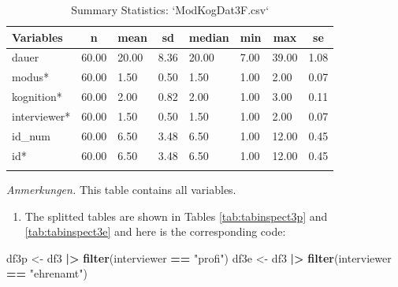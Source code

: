 \documentclass[
  doc,floatsintext]{apa6}
\newenvironment{Shaded}{\begin{snugshade}}{\end{snugshade}}
\newcommand{\FunctionTok}[1]{\textcolor[rgb]{0.13,0.29,0.53}{\textbf{#1}}}
\newcommand{\NormalTok}[1]{#1}
\newcommand{\OtherTok}[1]{\textcolor[rgb]{0.56,0.35,0.01}{#1}}
\newcommand{\SpecialCharTok}[1]{\textcolor[rgb]{0.81,0.36,0.00}{\textbf{#1}}}
\newcommand{\StringTok}[1]{\textcolor[rgb]{0.31,0.60,0.02}{#1}}
\providecommand{\tightlist}{%
  \setlength{\itemsep}{0pt}\setlength{\parskip}{0pt}}
\begin{document}
\begin{table}[tbp]

\begin{center}
\begin{threeparttable}

\caption{\label{tab:tabsumstat3correct}Summary Statistics: `ModKogDat3F.csv`}

\begin{tabular}{llllllll}
\toprule
Variables & \multicolumn{1}{c}{n} & \multicolumn{1}{c}{mean} & \multicolumn{1}{c}{sd} & \multicolumn{1}{c}{median} & \multicolumn{1}{c}{min} & \multicolumn{1}{c}{max} & \multicolumn{1}{c}{se}\\
\midrule
dauer & 60.00 & 20.00 & 8.36 & 20.00 & 7.00 & 39.00 & 1.08\\
modus* & 60.00 & 1.50 & 0.50 & 1.50 & 1.00 & 2.00 & 0.07\\
kognition* & 60.00 & 2.00 & 0.82 & 2.00 & 1.00 & 3.00 & 0.11\\
interviewer* & 60.00 & 1.50 & 0.50 & 1.50 & 1.00 & 2.00 & 0.07\\
id\_num & 60.00 & 6.50 & 3.48 & 6.50 & 1.00 & 12.00 & 0.45\\
id* & 60.00 & 6.50 & 3.48 & 6.50 & 1.00 & 12.00 & 0.45\\
\bottomrule
\addlinespace
\end{tabular}

\begin{tablenotes}[para]
\normalsize{\textit{Anmerkungen.} This table contains all variables.}
\end{tablenotes}

\end{threeparttable}
\end{center}

\end{table}

\begin{enumerate}
\def\labelenumi{\arabic{enumi}.}
\setcounter{enumi}{1}
\tightlist
\item
  The splitted tables are shown in Tables \ref{tab:tabinspect3p} and \ref{tab:tabinspect3e} and here is the corresponding code:
\end{enumerate}

\begin{Shaded}
\begin{Highlighting}[]
\NormalTok{df3p }\OtherTok{\textless{}{-}}\NormalTok{ df3 }\SpecialCharTok{|\textgreater{}} 
  \FunctionTok{filter}\NormalTok{(interviewer }\SpecialCharTok{==} \StringTok{"profi"}\NormalTok{)}
\NormalTok{df3e }\OtherTok{\textless{}{-}}\NormalTok{ df3 }\SpecialCharTok{|\textgreater{}} 
  \FunctionTok{filter}\NormalTok{(interviewer }\SpecialCharTok{==} \StringTok{"ehrenamt"}\NormalTok{)}
\end{Highlighting}
\end{Shaded}
\end{document}
